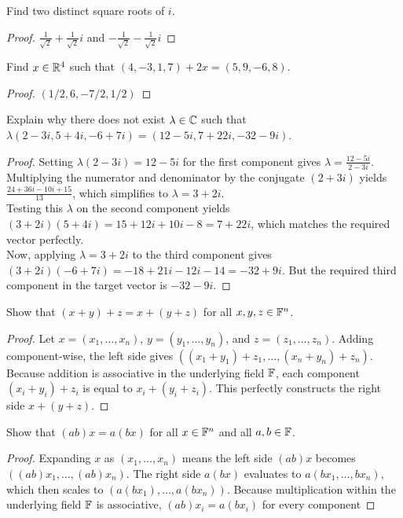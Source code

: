 \begin{question}
	Find two distinct square roots of $i$.
\end{question}
\begin{proof}
	$\frac{1}{\sqrt{2}} + \frac{1}{\sqrt{2}}i$ and $-\frac{1}{\sqrt{2}} - \frac{1}{\sqrt{2}}i$
\end{proof}
\begin{question}
	Find $x \in \mathbb{R}^4$ such that $(4, -3, 1, 7) + 2x = (5, 9, -6, 8)$.
\end{question}
\begin{proof}
	$(1/2, 6, -7/2, 1/2)$
\end{proof}
\begin{question}
	Explain why there does not exist $\lambda \in \mathbb{C}$ such that $\lambda(2 - 3i, 5 + 4i, -6 + 7i) = (12 - 5i, 7 + 22i, -32 - 9i)$. 
\end{question}
\begin{proof}
	Setting $\lambda(2 - 3i) = 12 - 5i$ for the first component gives $\lambda = \frac{12 - 5i}{2 - 3i}$.\\ Multiplying the numerator and denominator by the conjugate $(2 + 3i)$ yields $\frac{24 + 36i - 10i + 15}{13}$, which simplifies to $\lambda = 3 + 2i$.\\Testing this $\lambda$ on the second component yields $(3 + 2i)(5 + 4i) = 15 + 12i + 10i - 8 = 7 + 22i$, which matches the required vector perfectly.\\Now, applying $\lambda = 3 + 2i$ to the third component gives $(3 + 2i)(-6 + 7i) = -18 + 21i - 12i - 14 = -32 + 9i$. But the required third component in the target vector is $-32 - 9i$.
\end{proof}
\begin{question}
	Show that $(x + y) + z = x + (y + z)$ for all $x, y, z \in \mathbb{F}^n$.   
\end{question}
\begin{proof}
	Let $x = (x_1, \dots, x_n)$, $y = (y_1, \dots, y_n)$, and $z = (z_1, \dots, z_n)$. Adding component-wise, the left side gives $((x_1+y_1)+z_1, \dots, (x_n+y_n)+z_n)$. Because addition is associative in the underlying field $\mathbb{F}$, each component $(x_i+y_i)+z_i$ is equal to $x_i+(y_i+z_i)$. This perfectly constructs the right side $x+(y+z)$.
\end{proof}
\begin{question}
	Show that $(ab)x = a(bx)$ for all $x \in \mathbb{F}^n$ and all $a, b \in \mathbb{F}$.   
\end{question}
\begin{proof}
	Expanding $x$ as $(x_1, \dots, x_n)$ means the left side $(ab)x$ becomes $((ab)x_1, \dots, (ab)x_n)$. The right side $a(bx)$ evaluates to $a(bx_1, \dots, bx_n)$, which then scales to $(a(bx_1), \dots, a(bx_n))$. Because multiplication within the underlying field $\mathbb{F}$ is associative, $(ab)x_i = a(bx_i)$ for every component
\end{proof}
